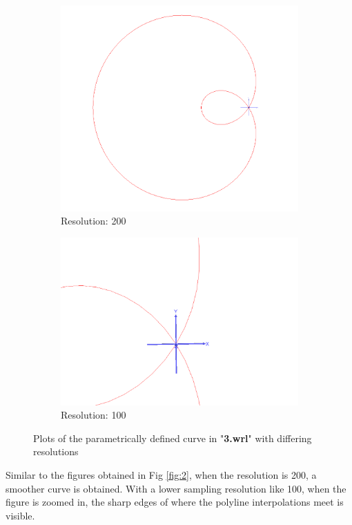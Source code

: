\documentclass[acmlarge,nonacm=true]{acmart}
\begin{document}
\begin{figure}[H]
	\begin{subfigure}{.4\textwidth}
	  \centering
	  \includegraphics[width=.8\linewidth]{fig/3_200}
	  \caption{Resolution: 200}
	\end{subfigure}%
	\begin{subfigure}{.4\textwidth}
	  \centering
	  \includegraphics[width=.8\linewidth]{fig/3_100}
	  \caption{Resolution: 100}
	\end{subfigure}
	\caption{Plots of the parametrically defined curve in "\textbf{3.wrl}" with differing resolutions}
	\label{fig:3}
\end{figure}

Similar to the figures obtained in Fig \ref{fig:2}, when the resolution is 200, a smoother curve is obtained. With a lower sampling resolution like 100, when the 
figure is zoomed in, the sharp edges of where the polyline interpolations meet is visible.







\newpage
\end{document}
